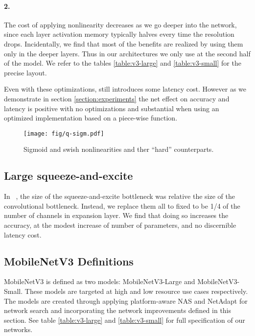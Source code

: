 \documentclass[10pt,twocolumn,letterpaper]{article}
\begin{document}
\paragraph{2.} The cost of applying nonlinearity decreases as we go deeper into the network, since
each layer activation memory typically halves every time the resolution drops. Incidentally, we find
that most of the benefits  are realized by using them only in the deeper layers. Thus in our architectures we only use
 at the second half of the model. We refer to the tables \ref{table:v3-large} and \ref{table:v3-small} for the precise
layout.

Even with these optimizations,   still introduces some latency cost. However
as we demonstrate in section \ref{section:experiments} the net effect on accuracy and
latency is positive with no optimizations and substantial when using an optimized implementation based on a piece-wise function.



\begin{figure}[!t]
    \centering
    \texttt{[image: fig/q-sigm.pdf]}
    \caption{Sigmoid and swish nonlinearities and ther ``hard'' counterparts.}
    \label{fig:qsigm}
\end{figure}

\subsection{Large squeeze-and-excite}
In ~\cite{mnasnet}, the size of the squeeze-and-excite bottleneck was relative the size of the convolutional bottleneck. Instead, we replace them all to fixed to be 1/4 of the number of channels in  expansion layer.  We find that doing so increases the accuracy, at the modest increase of number of  parameters, and no discernible latency cost. 

\subsection{MobileNetV3 Definitions}
MobileNetV3 is defined as two models: MobileNetV3-Large and MobileNetV3-Small. These models are targeted at high and low resource use cases respectively. The models are created through applying platform-aware NAS and NetAdapt for network search and incorporating the network improvements defined in this section. See table \ref{table:v3-large} and \ref{table:v3-small} for full specification of our networks.
\end{document}
